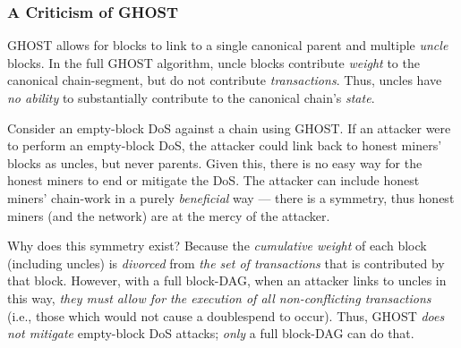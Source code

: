 \hypertarget{a-criticism-of-ghost}{%
\subsubsection{A Criticism of GHOST}\label{a-criticism-of-ghost}}

GHOST allows for blocks to link to a single canonical parent and multiple \emph{uncle} blocks.
In the full GHOST algorithm, uncle blocks contribute \emph{weight} to the canonical chain-segment, but do not contribute \emph{transactions}.
Thus, uncles have \emph{no ability} to substantially contribute to the canonical chain's \emph{state}.

Consider an empty-block DoS against a chain using GHOST.
If an attacker were to perform an empty-block DoS, the attacker could link back to honest miners' blocks as uncles, but never parents.
Given this, there is no easy way for the honest miners to end or mitigate the DoS.
The attacker can include honest miners' chain-work in a purely
\emph{beneficial} way --- there is a symmetry, thus honest miners (and the network) are at the mercy of the attacker.

Why does this symmetry exist? Because the \emph{cumulative weight} of each block (including uncles) is \emph{divorced} from \emph{the set of transactions} that is contributed by that block.
However, with a full block-DAG, when an attacker links to uncles in this way, \emph{they must allow for the execution of all non-conflicting transactions} (i.e., those which would not cause a doublespend to occur).
Thus, GHOST
\emph{does not mitigate} empty-block DoS attacks; \emph{only} a full block-DAG can do that.
